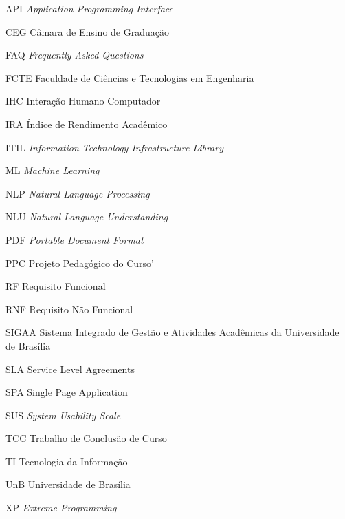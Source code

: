 \begin{siglas}
  \item[API] \textit{Application Programming Interface}
  \item[CEG] Câmara de Ensino de Graduação
  \item[FAQ] \textit{Frequently Asked Questions}
  \item[FCTE] Faculdade de Ciências e Tecnologias em Engenharia 
  \item[IHC] Interação Humano Computador
  \item[IRA] Índice de Rendimento Acadêmico
  \item[ITIL] \textit{Information Technology Infrastructure Library}
  \item[ML] \textit{Machine Learning} 
  \item[NLP] \textit{Natural Language Processing}
  \item[NLU] \textit{Natural Language Understanding}
  \item[PDF] \textit{Portable Document Format}
  \item[PPC] Projeto Pedagógico do Curso'
  \item[RF] Requisito Funcional
  \item[RNF] Requisito Não Funcional
  \item[SIGAA] Sistema Integrado de Gestão e Atividades Acadêmicas da Universidade de Brasília
  \item[SLA] Service Level Agreements
  \item[SPA] Single Page Application 
  \item[SUS] \textit{System Usability Scale}
  \item[TCC] Trabalho de Conclusão de Curso
  \item[TI] Tecnologia da Informação
  \item[UnB] Universidade de Brasília
  \item[XP] \textit{Extreme Programming}
\end{siglas}
